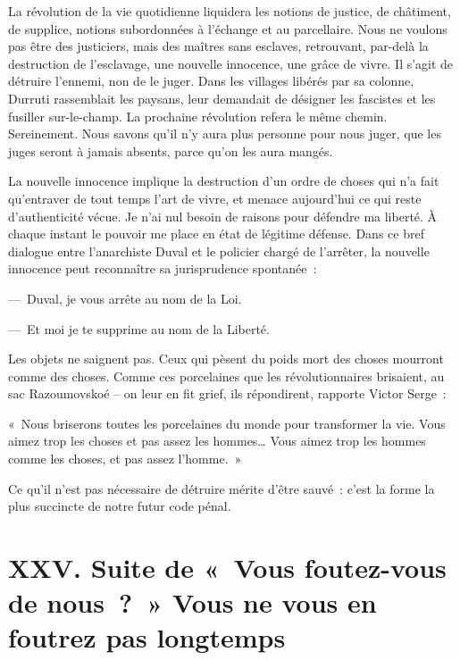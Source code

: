 \documentclass[french,twoside]{book} %
\newcommand{\astermono}{\medskip\centerline{\color{rubric}\large\selectfont{\syms ✻}}\medskip\par}%
\newenvironment{quoteblock}%
  {\begin{quoting}}
  {\end{quoting}}
\newenvironment{quotebar}{%
    \def\FrameCommand{{\color{rubric!10!}\vrule width 0.5em} \hspace{0.9em}}%
    \def\OuterFrameSep{\itemsep} %
    \MakeFramed {\advance\hsize-\width \FrameRestore}
  }%
  {%
    \endMakeFramed
  }
\renewenvironment{quoteblock}%
  {%
    \savenotes
    \setstretch{0.9}
    \normalfont
    \begin{quotebar}
  }
  {%
    \end{quotebar}
    \spewnotes
  }
\begin{document}
\astermono

\noindent La révolution de la vie quotidienne liquidera les notions de justice, de châtiment, de supplice, notions subordonnées à l’échange et au parcellaire. Nous ne voulons pas être des justiciers, mais des maîtres sans esclaves, retrouvant, par-delà la destruction de l’esclavage, une nouvelle innocence, une grâce de vivre. Il s’agit de détruire l’ennemi, non de le juger. Dans les villages libérés par sa colonne, Durruti rassemblait les paysans, leur demandait de désigner les fascistes et les fusiller sur-le-champ. La prochaine révolution refera le même chemin. Sereinement. Nous savons qu’il n’y aura plus personne pour nous juger, que les juges seront à jamais absents, parce qu’on les aura mangés.\par
La nouvelle innocence implique la destruction d’un ordre de choses qui n’a fait qu’entraver de tout temps l’art de vivre, et menace aujourd’hui ce qui reste d’authenticité vécue. Je n’ai nul besoin de raisons pour défendre ma liberté. À chaque instant le pouvoir me place en état de légitime défense. Dans ce bref dialogue entre l’anarchiste Duval et le policier chargé de l’arrêter, la nouvelle innocence peut reconnaître sa jurisprudence spontanée :\par
— Duval, je vous arrête au nom de la Loi.\par
— Et moi je te supprime au nom de la Liberté.\par
Les objets ne saignent pas. Ceux qui pèsent du poids mort des choses mourront comme des choses. Comme ces porcelaines que les révolutionnaires brisaient, au sac Razoumovskoé – on leur en fit grief, ils répondirent, rapporte Victor Serge :\par

\begin{quoteblock}
\noindent « Nous briserons toutes les porcelaines du monde pour transformer la vie. Vous aimez trop les choses et pas assez les hommes… Vous aimez trop les hommes comme les choses, et pas assez l’homme. »\end{quoteblock}

\noindent Ce qu’il n’est pas nécessaire de détruire mérite d’être sauvé : c’est la forme la plus succincte de notre futur code pénal.
\section[{XXV. Suite de « Vous foutez-vous de nous ? » Vous ne vous en foutrez pas longtemps}]{XXV. Suite de « Vous foutez-vous de nous ? » Vous ne vous en foutrez pas longtemps}\renewcommand{\leftmark}{XXV. Suite de « Vous foutez-vous de nous ? » Vous ne vous en foutrez pas longtemps}
\end{document}
